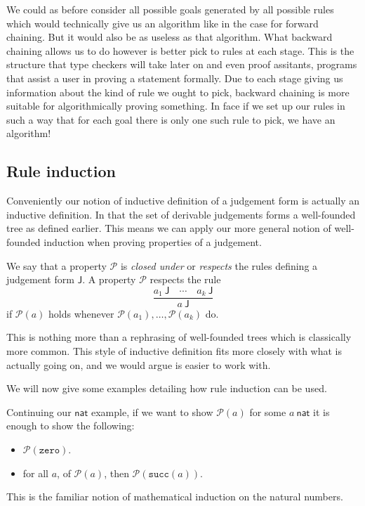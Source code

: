 \begin{remark}
    We could as before consider all possible goals generated by all possible rules which would technically give us an algorithm like in the case for forward chaining. But it would also be as useless as that algorithm. What backward chaining allows us to do however is better pick to rules at each stage. This is the structure that type checkers will take later on and even proof assitants, programs that assist a user in proving a statement formally. Due to each stage giving us information about the kind of rule we ought to pick, backward chaining is more suitable for algorithmically proving something. In face if we set up our rules in such a way that for each goal there is only one such rule to pick, we have an algorithm!
\end{remark}

\subsection{Rule induction}

Conveniently our notion of inductive definition of a judgement form is actually an inductive definition. In that the set of derivable judgements forms a well-founded tree as defined earlier. This means we can apply our more general notion of well-founded induction when proving properties of a judgement.

\begin{defin}
    We say that a property $\mathcal{P}$ is \emph{closed under} or \emph{respects} the rules defining a judgement form $\mathsf{J}$. A property $\mathcal{P}$ respects the rule
    $$
        \frac
        {a_1\ \mathsf{J}\quad \cdots \quad a_k\ \mathsf{J}}
        {a \ \mathsf{J}}
    $$
    if $\mathcal{P}(a)$ holds whenever $\mathcal{P}(a_1), \dots, \mathcal{P}(a_k)$ do.
\end{defin}

\begin{remark}
    This is nothing more than a rephrasing of well-founded trees which is classically more common. This style of inductive definition fits more closely with what is actually going on, and we would argue is easier to work with.
\end{remark}


We will now give some examples detailing how rule induction can be used.

\begin{example}
    Continuing our $\mathsf{nat}$ example, if we want to show $\mathcal{P}(a)$ for some $a\ \mathsf{nat}$ it is enough to show the following:
    \begin{itemize}
        \item $\mathcal{P}(\texttt{zero})$.
        \item for all $a$, of $\mathcal{P}(a)$, then $\mathcal{P}(\texttt{succ}(a))$.
    \end{itemize}
    
    This is the familiar notion of mathematical induction on the natural numbers.
\end{example}

